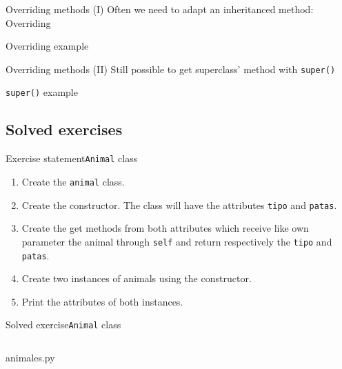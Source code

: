 \documentclass[10pt,compress]{beamer} %
\begin{document}
\begin{frame}[shrink]{Overriding methods (I)}
	Often we need to adapt an inheritanced method: \alert{Overriding}

	\begin{block}{Overriding example}
		\vspace{-0.2cm}
		
		\vspace{-0.2cm}
	\end{block}
\end{frame}
	
\begin{frame}{Overriding methods (II)}
		Still possible to get superclass' method with \texttt{super()}

	\begin{block}{\texttt{super()} example}
		\vspace{-0.2cm}
		
		\vspace{-0.2cm}
	\end{block}
\end{frame}

\subsection{Solved exercises}

\begin{frame}{Exercise statement}{\texttt{Animal} class}
	\begin{enumerate}
		\item Create the \texttt{animal} class. 
		\item Create the constructor. The class will have the attributes \texttt{tipo} and \texttt{patas}.
		\item Create the get methods from both attributes which receive like own parameter the animal through \texttt{self} and return respectively the \texttt{tipo} and \texttt{patas}. 
		\item Create two instances of animals using the constructor.
		\item Print the attributes of both instances.
	\end{enumerate}	
\end{frame}

\begin{frame}{Solved exercise}{\texttt{Animal} class}
	\vspace{-0.2cm}
    \begin{columns}
			\begin{block}{animales.py}
			\vspace{-0.3cm} 
			\vspace{-0.3cm} 
			\end{block}
	\end{columns}
\end{frame}
\end{document}
